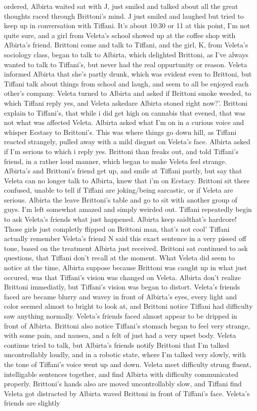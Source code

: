 \documentclass[12pt]{book}
\begin{document}
ordered, Albirta waited sat with J, just smiled and talked about all the great thoughts raced through Brittoni's mind. J just smiled and laughed but tried to keep up in conversation with Tiffani. It's about 10:30 or 11 at this point, I'm not quite sure, and a girl from Veleta's school showed up at the coffee shop with Albirta's friend. Brittoni come and talk to Tiffani, and the girl, K, from Veleta's sociology class, began to talk to Albirta, which delighted Brittoni, as I've always wanted to talk to Tiffani's, but never had the real oppurtunity or reason. Veleta informed Albirta that she's partly drunk, which was evident even to Brittoni, but Tiffani talk about things from school and laugh, and seem to all be enjoyed each other's company. Veleta turned to Albirta and asked if Brittoni smoke weeded, to which Tiffani reply yes, and Veleta askedare Albirta stoned right now?'. Brittoni explain to Tiffani's, that while i did get high on cannabis that evened, that was not what was affected Veleta. Albirta asked what I'm on in a curious voice and whisper Ecstasy to Brittoni's. This was where things go down hill, as Tiffani reacted strangely, pulled away with a mild disgust on Veleta's face. Albirta asked if I'm serious to which i reply yes. Brittoni than freaks out, and told Tiffani's friend, in a rather loud manner, which began to make Veleta feel strange. Albirta's and Brittoni's friend get up, and smile at Tiffani partly, but say that Veleta can no longer talk to Albirta, knew that i'm on Ecstacy. Brittoni sit there confused, unable to tell if Tiffani are joking/being sarcastic, or if Veleta are serious. Albirta the leave Brittoni's table and go to sit with another group of guys. I'm left somewhat amazed and simply weirded out. Tiffani repeatedly begin to ask Veleta's friends what just happened. Albirta keep saidthat's hardcore! Those girls just completly flipped on Brittoni man, that's not cool' Tiffani actually remember Veleta's friend N said this exact sentence in a very pissed off tone, based on the treatment Albirta just received. Brittoni sat continued to ask questions, that Tiffani don't recall at the moment. What Veleta did seem to notice at the time, Albirta suppose because Brittoni was caught up in what just occured, was that Tiffani's vision was changed on Veleta. Albirta don't realize Brittoni immediatly, but Tiffani's vision was began to distort. Veleta's friends faced are became blurry and wavey in front of Albirta's eyes, every light and color seemed almost to bright to look at, and Brittoni notice Tiffani had difficulty saw anything normally. Veleta's friends faced almost appear to be dripped in front of Albirta. Brittoni also notice Tiffani's stomach began to feel very strange, with some pain, and nausea, and a felt of just had a very upset body. Veleta continue tried to talk, but Albirta's friends notify Brittoni that I'm talked uncontrollably loudly, and in a robotic state, where I'm talked very slowly, with the tone of Tiffani's voice went up and down. Veleta meet difficulty strung fluent, intelligable sentences together, and find Albirta with difficulty communicated properly. Brittoni's hands also are moved uncontrollably slow, and Tiffani find Veleta got distracted by Albirta waved Brittoni in front of Tiffani's face. Veleta's friends are slightly 
\end{document}
